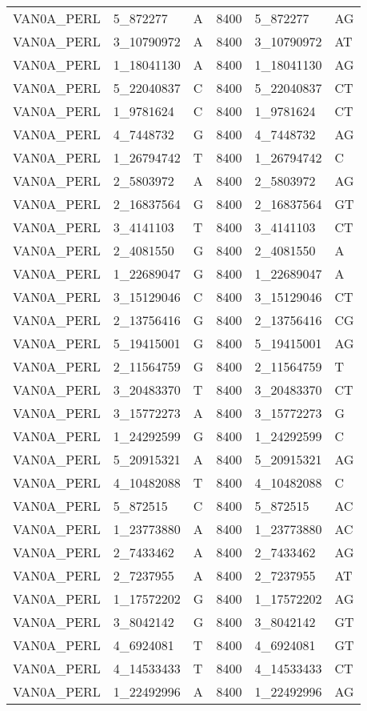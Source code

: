 \begin{center}
\begin{longtable}{|l|l|l|l|l|l|}
VAN0A\_PERL&5\_872277&A&8400&5\_872277&AG\\
VAN0A\_PERL&3\_10790972&A&8400&3\_10790972&AT\\
VAN0A\_PERL&1\_18041130&A&8400&1\_18041130&AG\\
VAN0A\_PERL&5\_22040837&C&8400&5\_22040837&CT\\
VAN0A\_PERL&1\_9781624&C&8400&1\_9781624&CT\\
VAN0A\_PERL&4\_7448732&G&8400&4\_7448732&AG\\
VAN0A\_PERL&1\_26794742&T&8400&1\_26794742&C\\
VAN0A\_PERL&2\_5803972&A&8400&2\_5803972&AG\\
VAN0A\_PERL&2\_16837564&G&8400&2\_16837564&GT\\
VAN0A\_PERL&3\_4141103&T&8400&3\_4141103&CT\\
VAN0A\_PERL&2\_4081550&G&8400&2\_4081550&A\\
VAN0A\_PERL&1\_22689047&G&8400&1\_22689047&A\\
VAN0A\_PERL&3\_15129046&C&8400&3\_15129046&CT\\
VAN0A\_PERL&2\_13756416&G&8400&2\_13756416&CG\\
VAN0A\_PERL&5\_19415001&G&8400&5\_19415001&AG\\
VAN0A\_PERL&2\_11564759&G&8400&2\_11564759&T\\
VAN0A\_PERL&3\_20483370&T&8400&3\_20483370&CT\\
VAN0A\_PERL&3\_15772273&A&8400&3\_15772273&G\\
VAN0A\_PERL&1\_24292599&G&8400&1\_24292599&C\\
VAN0A\_PERL&5\_20915321&A&8400&5\_20915321&AG\\
VAN0A\_PERL&4\_10482088&T&8400&4\_10482088&C\\
VAN0A\_PERL&5\_872515&C&8400&5\_872515&AC\\
VAN0A\_PERL&1\_23773880&A&8400&1\_23773880&AC\\
VAN0A\_PERL&2\_7433462&A&8400&2\_7433462&AG\\
VAN0A\_PERL&2\_7237955&A&8400&2\_7237955&AT\\
VAN0A\_PERL&1\_17572202&G&8400&1\_17572202&AG\\
VAN0A\_PERL&3\_8042142&G&8400&3\_8042142&GT\\
VAN0A\_PERL&4\_6924081&T&8400&4\_6924081&GT\\
VAN0A\_PERL&4\_14533433&T&8400&4\_14533433&CT\\
VAN0A\_PERL&1\_22492996&A&8400&1\_22492996&AG\\

\end{longtable}
\end{center}
